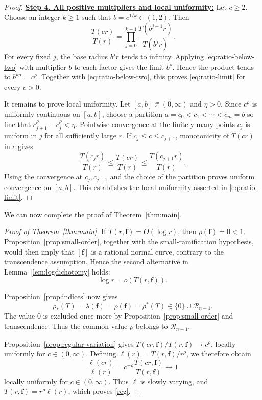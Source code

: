 \documentclass[12pt,letterpaper,reqno]{amsart}
\theoremstyle{definition}
\numberwithin{equation}{section}
\newcommand{\Gn}{\mathcal R_{n+1}}
\newcommand{\fv}{\bm f}
\begin{document}
\begin{proof}
\medskip\noindent
\textbf{\underline{Step 4. All positive multipliers and local uniformity:}}
Let \(c\geq2\). Choose an integer \(k\geq1\) such that
\(b=c^{1/k}\in(1,2)\). Then
\[
\frac{T(cr)}{T(r)}
=
\prod_{j=0}^{k-1}
\frac{T(b^{j+1}r)}{T(b^jr)}.
\]
For every fixed \(j\), the base radius \(b^jr\) tends to infinity.
Applying \eqref{eq:ratio-below-two} with multiplier \(b\) to each
factor gives the limit \(b^\rho\). Hence the product tends to
\(b^{k\rho}=c^\rho\). Together with
\eqref{eq:ratio-below-two}, this proves \eqref{eq:ratio-limit} for
every \(c>0\).

It remains to prove local uniformity. Let
\([a,b]\Subset(0,\infty)\) and \(\eta>0\). Since \(c^\rho\) is
uniformly continuous on \([a,b]\), choose a partition
\(a=c_0<c_1<\cdots<c_m=b\) so fine that
\(c_{j+1}^\rho-c_j^\rho<\eta\).
Pointwise convergence at the finitely many points \(c_j\) is uniform
in \(j\) for all sufficiently large \(r\). If
\(c_j\leq c\leq c_{j+1}\), monotonicity of \(T(cr)\) in \(c\) gives
\[
\frac{T(c_jr)}{T(r)}
\leq
\frac{T(cr)}{T(r)}
\leq
\frac{T(c_{j+1}r)}{T(r)}.
\]
Using the convergence at \(c_j,c_{j+1}\) and the choice of the
partition proves uniform convergence on \([a,b]\). This establishes
the local uniformity asserted in \eqref{eq:ratio-limit}.
\end{proof}


We can now complete the proof of Theorem~\ref{thm:main}.

\begin{proof}[Proof of Theorem~\ref{thm:main}]
If \(T(r,\fv)=O(\log r)\), then \(\rho(\fv)=0<1\).
Proposition~\ref{prop:small-order}, together with the small-ramification
hypothesis, would then imply that \([\fv]\) is a rational normal curve,
contrary to the transcendence assumption. Hence the second alternative
in Lemma~\ref{lem:logdichotomy} holds:
\[
\log r=o(T(r,\fv)).
\]

Proposition~\ref{prop:indices} now gives
\[
\rho_*(T)
=
\lambda(\fv)
=
\rho(\fv)
=
\rho^*(T)
\in
\{0\}\cup\Gn.
\]
The value \(0\) is excluded once more by
Proposition~\ref{prop:small-order} and transcendence. Thus the common
value \(\rho\) belongs to \(\Gn\).

Proposition~\ref{prop:regular-variation} gives
\(T(cr,\fv)/T(r,\fv)\to c^\rho\), locally uniformly for
\(c\in(0,\infty)\). Defining
\(\ell(r)=T(r,\fv)/r^\rho\), we therefore obtain
\[
\frac{\ell(cr)}{\ell(r)}
=
c^{-\rho}
\frac{T(cr,\fv)}{T(r,\fv)}
\longrightarrow1
\]
locally uniformly for \(c\in(0,\infty)\). Thus \(\ell\) is slowly
varying, and
\(T(r,\fv)=r^\rho\ell(r)\), which proves \eqref{reg}.
\end{proof}
\end{document}
